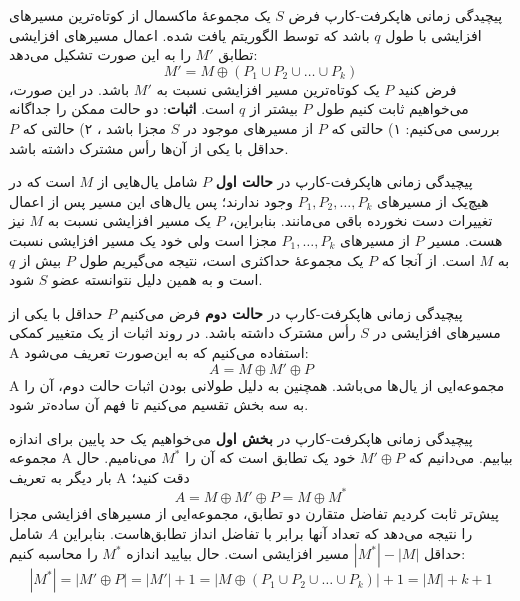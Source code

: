 \begin{itemframe}{‌پیچیدگی زمانی هاپکرفت-کارپ}
\itm
فرض $S$ یک مجموعهٔ ماکسمال از کوتاه‌ترین مسیرهای افزایشی با طول $q$ باشد که توسط الگوریتم یافت شده.
اعمال مسیرهای افزایشی تطابق $M'$ را به این صورت تشکیل می‌دهد:
$$
M' = M \oplus (P_1 \cup P_2 \cup \dots \cup P_k)
$$
\itm
فرض کنید $P$ یک کوتاه‌ترین مسیر افزایشی نسبت به $M'$ باشد. در این صورت، می‌خواهیم ثابت کنیم طول $P$ بیشتر از $q$ است.
\itm
\textbf{اثبات}:
 دو حالت ممکن را جداگانه بررسی می‌کنیم:
 ۱) حالتی که $P$ از مسیرهای موجود در $S$ مجزا باشد ،
 ۲) حالتی که $P$ حداقل با یکی از آن‌ها رأس مشترک داشته باشد.
\end{itemframe}


\begin{itemframe}{‌پیچیدگی زمانی هاپکرفت-کارپ}
\itm
در \textbf{حالت اول}  $P$ شامل یال‌هایی از $M$ است که در هیچ‌یک از مسیرهای $P_1, P_2, \dots, P_k$ وجود ندارند؛ پس یال‌های این مسیر پس از اعمال تغییرات دست نخورده باقی می‌مانند. بنابراین، $P$ یک مسیر افزایشی نسبت به $M$ نیز هست.
\itm
 مسیر $P$ از مسیرهای $P_1, \dots, P_k$ مجزا است ولی خود یک مسیر افزایشی نسبت به $M$ است. از آنجا که $P$ یک مجموعهٔ حداکثری است، نتیجه می‌گیریم طول $P$ بیش از $q$ است و به همین دلیل نتوانسته عضو $S$ شود.
\end{itemframe}


\begin{itemframe}{‌پیچیدگی زمانی هاپکرفت-کارپ}
\itm
در \textbf{حالت دوم} فرض می‌کنیم $P$ حداقل با یکی از مسیرهای افزایشی در $S$ رأس مشترک داشته باشد.
\itm
در روند اثبات از یک متغییر کمکی A استفاده می‌کنیم که به این‌صورت تعریف می‌شود:
$$
A = M \oplus M' \oplus P
$$
A
 مجموعه‌ایی از یال‌ها می‌باشد.
\itm
همچنین به دلیل طولانی بودن اثبات حالت دوم، آن را به سه بخش تقسیم می‌کنیم تا فهم آن ساده‌تر شود.
\end{itemframe}


\begin{itemframe}{‌پیچیدگی زمانی هاپکرفت-کارپ}
\itm
در \textbf{بخش اول} می‌خواهیم یک حد پایین برای اندازه مجموعه A بیابیم.
\itm
می‌دانیم که $M' \oplus P$ خود یک تطابق است که آن را $M^*$ می‌نامیم. حال بار دیگر به تعریف A دقت کنید؛
$$
A = M \oplus M' \oplus P = M \oplus M^*
$$
\itm
پیش‌تر ثابت کردیم تفاضل متقارن دو تطابق، مجموعه‌ایی از مسیر‌های افزایشی مجزا را نتیجه می‌دهد که تعداد آنها برابر با تفاضل انداز تطابق‌هاست. بنابراین $A$ شامل حداقل $|M^*| - |M|$ مسیر افزایشی است.
\itm
 حال بیایید اندازه $M^*$ را محاسبه کنیم:
$$
|M^*| =  |M' \oplus P| = |M'| + 1 = |M \oplus (P_1 \cup P_2 \cup \dots \cup P_k)| + 1= |M| + k + 1
$$
\end{itemframe}



